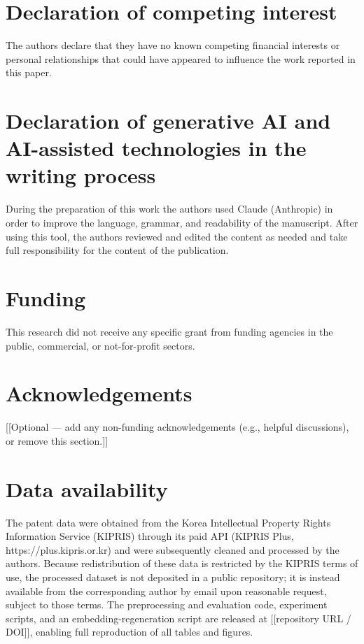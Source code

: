 \documentclass[preprint,12pt]{elsarticle}
\begin{document}
\section*{Declaration of competing interest}
The authors declare that they have no known competing financial interests or
personal relationships that could have appeared to influence the work reported in
this paper.

\section*{Declaration of generative AI and AI-assisted technologies in the writing process}
During the preparation of this work the authors used Claude (Anthropic) in order to
improve the language, grammar, and readability of the manuscript. After using this
tool, the authors reviewed and edited the content as needed and take full
responsibility for the content of the publication.

\section*{Funding}
This research did not receive any specific grant from funding agencies in the public,
commercial, or not-for-profit sectors.

\section*{Acknowledgements}
[[Optional --- add any non-funding acknowledgements (e.g., helpful discussions), or
remove this section.]]

\section*{Data availability}
The patent data were obtained from the Korea Intellectual Property Rights Information
Service (KIPRIS) through its paid API (KIPRIS Plus, https://plus.kipris.or.kr) and
were subsequently cleaned and processed by the authors. Because redistribution of
these data is restricted by the KIPRIS terms of use, the processed dataset is not
deposited in a public repository; it is instead available from the corresponding
author by email upon reasonable request, subject to those terms. The preprocessing and
evaluation code, experiment scripts, and an embedding-regeneration script are released
at [[repository URL / DOI]], enabling full reproduction of all tables and figures.
\end{document}

